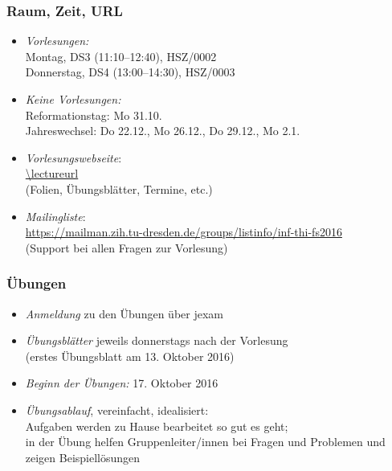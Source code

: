 \documentclass[onlymath]{beamer}
\begin{document}
\maketitle



\begin{frame}\frametitle{Raum, Zeit, URL}

\begin{itemize}
\item \emph{Vorlesungen:}\\
	Montag, DS3 (11:10--12:40), HSZ/0002\\
	Donnerstag, DS4 (13:00--14:30), HSZ/0003
\item \emph{Keine Vorlesungen:}\\
	Reformationstag: Mo 31.10.\\
	Jahreswechsel: Do 22.12., Mo 26.12., Do 29.12., Mo 2.1.
\item \emph{Vorlesungswebseite}:\\[1ex]
	\url{\lectureurl}\\[1ex]
	(Folien, Übungsblätter, Termine, etc.)
\item \emph{Mailingliste}:\\[1ex]
	\url{https://mailman.zih.tu-dresden.de/groups/listinfo/inf-thi-fs2016}\\[1ex]
	(Support bei allen Fragen zur Vorlesung)
\end{itemize}

\end{frame}


\begin{frame}\frametitle{Übungen}
\begin{itemize}
\item \emph{Anmeldung} zu den Übungen über jexam
\item \emph{Übungsblätter} jeweils donnerstags nach der Vorlesung\\
	(erstes Übungsblatt am 13. Oktober 2016)
\item \emph{Beginn der Übungen:} 17. Oktober 2016
\item \emph{Übungsablauf}, vereinfacht, idealisiert:\\
	Aufgaben werden zu Hause bearbeitet so gut es geht;\\
	in der Übung helfen Gruppenleiter/innen bei Fragen und Problemen und zeigen Beispiellösungen\\[1ex]
\end{itemize}

\end{frame}
\end{document}
